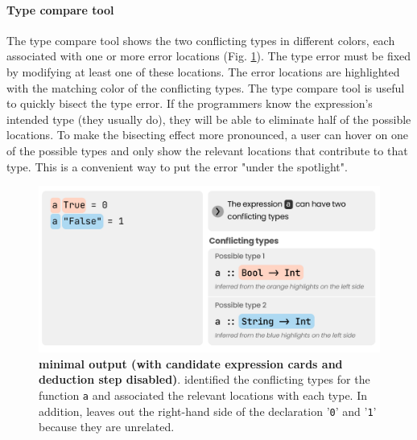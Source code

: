 \paragraph{Type compare tool} \label{sub:type-compare}

The type compare tool shows the two conflicting types in different colors, each associated with one or more error locations (Fig. \ref{fig:compare}).  The type error must be fixed by modifying at least one of these locations. The error locations are highlighted with the matching color of the conflicting types. The type compare tool is useful to quickly bisect the type error. If the programmers know the expression's intended type (they usually do), they will be able to eliminate half of the possible locations. To make the bisecting effect more pronounced, a user can hover on one of the possible types and only show the relevant locations that
contribute to that type. This is a convenient way to put the error "under the spotlight".


\begin{figure}[h]
    \centering
    \includegraphics[width=\linewidth]{images/intro-compare.pdf}
    \caption{
        \textbf{\chameleon{} minimal output (with candidate expression cards and deduction step disabled)}. \chameleon{} identified the conflicting types for the function \texttt{a} and associated the relevant locations with each type. In addition, \chameleon{} leaves out the right-hand side of the declaration '\texttt{0}' and '\texttt{1}' because they are unrelated.
}
    \label{fig:compare}
\end{figure}

